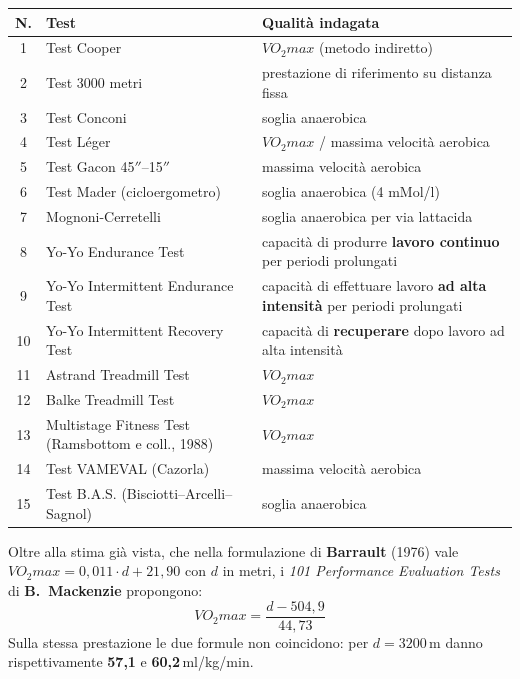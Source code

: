 \begin{table}[htbp]
  \centering
  \small
  \renewcommand{\arraystretch}{1.3}
  \begin{tabularx}{\textwidth}{|c|l|X|}
    \hline
    \textbf{N.} & \textbf{Test} & \textbf{Qualità indagata} \\
    \hline
    1 & Test Cooper & $VO_2max$ (metodo indiretto) \\
    \hline
    2 & Test 3000 metri & prestazione di riferimento su distanza fissa \\
    \hline
    3 & Test Conconi & soglia anaerobica \\
    \hline
    4 & Test Léger & $VO_2max$ / massima velocità aerobica \\
    \hline
    5 & Test Gacon 45$''$--15$''$ & massima velocità aerobica \\
    \hline
    6 & Test Mader (cicloergometro) & soglia anaerobica (4 mMol/l) \\
    \hline
    7 & Mognoni-Cerretelli & soglia anaerobica per via lattacida \\
    \hline
    8 & Yo-Yo Endurance Test & capacità di produrre \textbf{lavoro continuo} per periodi prolungati
      \\
    \hline
    9 & Yo-Yo Intermittent Endurance Test & capacità di effettuare lavoro \textbf{ad alta
      intensità} per periodi prolungati \\
    \hline
    10 & Yo-Yo Intermittent Recovery Test & capacità di \textbf{recuperare} dopo lavoro ad alta
      intensità \\
    \hline
    11 & Astrand Treadmill Test & $VO_2max$ \\
    \hline
    12 & Balke Treadmill Test & $VO_2max$ \\
    \hline
    13 & Multistage Fitness Test (Ramsbottom e coll., 1988) & $VO_2max$ \\
    \hline
    14 & Test VAMEVAL (Cazorla) & massima velocità aerobica \\
    \hline
    15 & Test B.A.S. (Bisciotti--Arcelli--Sagnol) & soglia anaerobica \\
    \hline
  \end{tabularx}
\end{table}

Oltre alla stima già vista, che nella formulazione di \textbf{Barrault} (1976) vale
$VO_2max = 0{,}011 \cdot d + 21{,}90$ con $d$ in metri, i \textit{101 Performance Evaluation Tests}
di \textbf{B.\ Mackenzie} propongono:
\[
  VO_2max = \frac{d - 504{,}9}{44{,}73}
\]
Sulla stessa prestazione le due formule non coincidono: per $d = 3200$\,m danno rispettivamente
\textbf{57,1} e \textbf{60,2}\,ml/kg/min.

